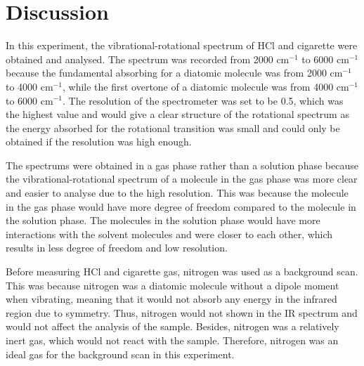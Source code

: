 \documentclass[twocolumn]{article} %
\begin{document}






\section{Discussion}


In this experiment, the vibrational-rotational spectrum of HCl and cigarette were obtained and analysed. The spectrum was recorded from 2000 cm$^{-1}$ to 6000 cm$^{-1}$ because the fundamental absorbing for a diatomic molecule was from 2000 cm$^{-1}$ to 4000 cm$^{-1}$, while the first overtone of a diatomic molecule was from 4000 cm$^{-1}$ to 6000 cm$^{-1}$. The resolution of the spectrometer was set to be 0.5, which was the highest value and would give a clear structure of the rotational spectrum as the energy absorbed for the rotational transition was small and could only be obtained if the resolution was high enough. 

The spectrums were obtained in a gas phase rather than a solution phase because the vibrational-rotational spectrum of a molecule in the gas phase was more clear and easier to analyse due to the high resolution. This was because the molecule in the gas phase would have more degree of freedom compared to the molecule in the solution phase. The molecules in the solution phase would have more interactions with the solvent molecules and were closer to each other, which results in less degree of freedom and low resolution. 

Before measuring HCl and cigarette gas, nitrogen was used as a background scan. This was because nitrogen was a diatomic molecule without a dipole moment when vibrating, meaning that it would not absorb any energy in the infrared region due to symmetry. Thus, nitrogen would not shown in the IR spectrum and would not affect the analysis of the sample. Besides, nitrogen was a relatively inert gas, which would not react with the sample. Therefore, nitrogen was an ideal gas for the background scan in this experiment. 
\end{document}
